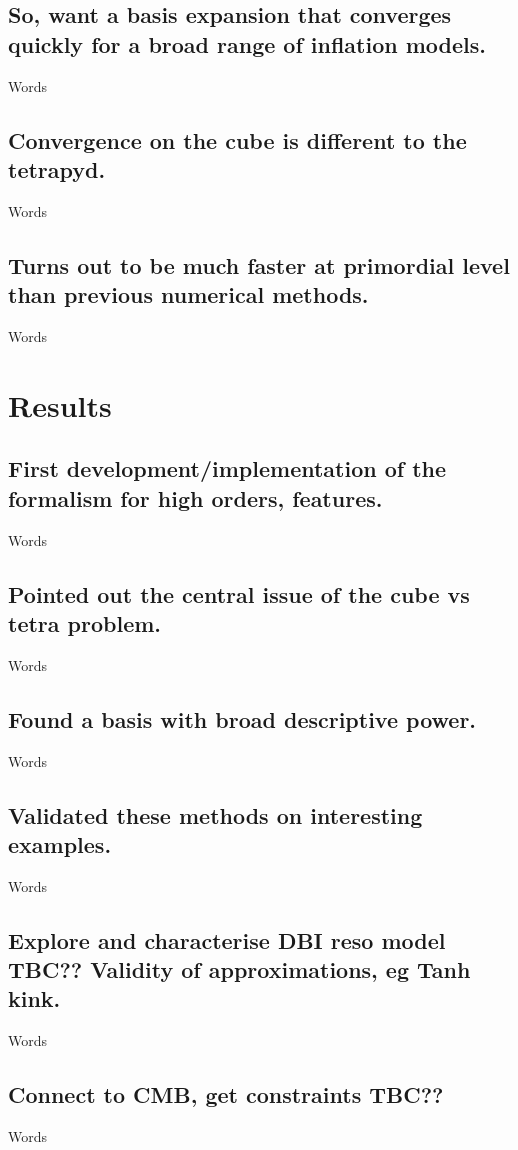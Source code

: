     \subsection{So, want a basis expansion that converges quickly for a broad range of inflation models.}
    Words
    \subsection{Convergence on the cube is different to the tetrapyd.}
    Words
    \subsection{Turns out to be much faster at primordial level than previous numerical methods.}
    Words
\section{Results}
    \subsection{First development/implementation of the formalism for high orders, features.}
    Words
    \subsection{Pointed out the central issue of the cube vs tetra problem.}
    Words
    \subsection{Found a basis with broad descriptive power.}
    Words
    \subsection{Validated these methods on interesting examples.}
    Words
    \subsection{Explore and characterise DBI reso model TBC?? Validity of approximations, eg Tanh kink.}
    Words
    \subsection{Connect to CMB, get constraints TBC??}
    Words

